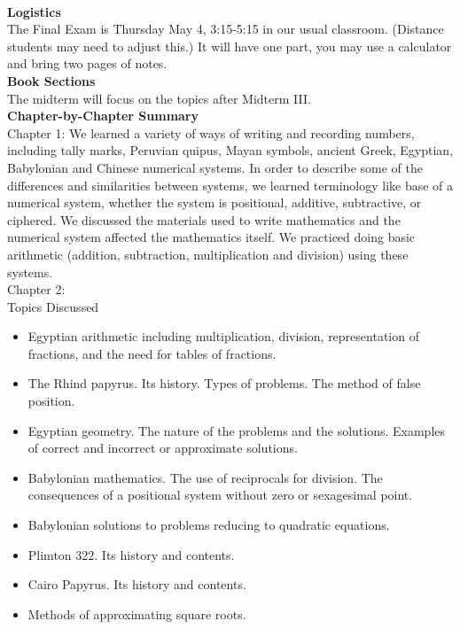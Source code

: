 \documentclass[11pt,fleqn]{article}
\begin{document}
\renewcommand{\headrulewidth}{0pt}
\newcommand{\blank}[1]{\rule{#1}{0.75pt}}
\newcommand{\bc}{\begin{center}}
\newcommand{\ec}{\end{center}}
\renewcommand{\d}{\displaystyle}

\vspace*{-0.7in}

\begin{center}
  \large
  \\
\end{center}
\noindent\textbf{Logistics}\\

The Final Exam is Thursday  May 4, 3:15-5:15 in our usual classroom. (Distance students may need to adjust this.) It will have one part, you may use a calculator and bring two pages of notes.  \\

\noindent\textbf{Book Sections}\\

The midterm will focus on the topics after Midterm III.\\

\noindent\textbf{Chapter-by-Chapter Summary}\\

Chapter 1: We learned a variety of ways of writing and recording numbers, including tally marks,  Peruvian quipus, Mayan symbols, ancient Greek, Egyptian, Babylonian and Chinese numerical systems. In order to describe some of the differences and similarities between systems, we learned terminology like base of a numerical system, whether the system is positional, additive, subtractive,  or ciphered. We discussed the materials used to write mathematics and the numerical system affected the mathematics itself. We practiced doing basic arithmetic (addition, subtraction, multiplication and division) using these systems.\\

Chapter 2: \\
Topics Discussed 
\begin{itemize}
\item Egyptian arithmetic including multiplication, division, representation of fractions, and the need for tables of fractions. 
\item The Rhind papyrus. Its history. Types of problems. The method of false position. 
\item Egyptian geometry. The nature of the problems and the solutions. Examples of correct and incorrect or approximate solutions.
\item Babylonian mathematics. The use of reciprocals for division. The consequences of a positional system without zero or sexagesimal point.
\item Babylonian solutions to problems reducing to quadratic equations.
\item Plimton 322. Its history and contents. 
\item Cairo Papyrus. Its history and contents. 
\item Methods of approximating square roots.\\
\end{itemize}
\end{document}
